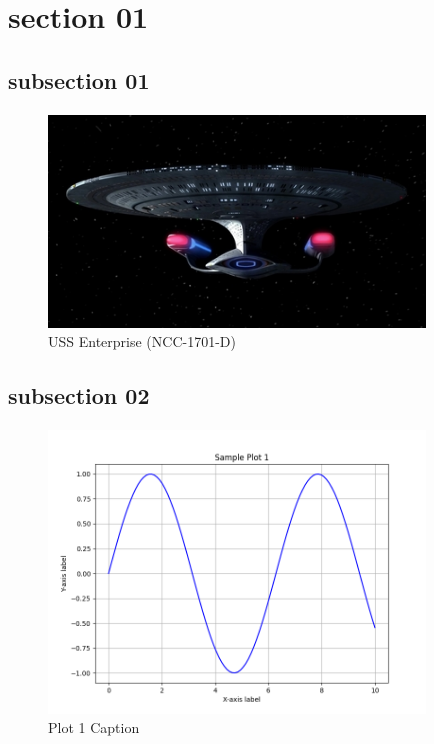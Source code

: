 \documentclass[class=book, crop=false]{standalone}
\begin{document}
\section{section 01}

\subsection{subsection 01}

\paragraph*{}
\blindtext

\paragraph*{}
\blindtext

\begin{figure}[htbp]
    \centering
    \includegraphics[width=10cm]{../../../figures_and_plots/figures/Enterprise_Forward.jpg}
    \caption{USS Enterprise (NCC-1701-D)}
    \label{fig:uss_enterprise}
\end{figure}

\subsection{subsection 02}

\paragraph*{}
\Blindtext

\begin{figure}[htbp]
    \centering
    \includegraphics[width=10cm]{../../../figures_and_plots/plots/plot1.png}
    \caption{Plot 1 Caption}
    \label{fig:plot1}
\end{figure}
\end{document}
